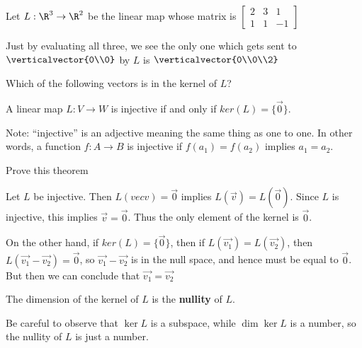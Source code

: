 \documentclass{ximera}
\begin{document}
\begin{question}
	Let $L:\R^3 \to \R^2$ be the linear map whose matrix is 
	\( \begin{bmatrix} 
		2 & 3 & 1\\
		1 & 1 & -1
	\end{bmatrix}\)
	\begin{solution}
		\begin{hint}
			Just by evaluating all three, we see the only one which gets sent to $\verticalvector{0\\0}$ by $L$ is $\verticalvector{0\\0\\2}$
		\end{hint}
		Which of the following vectors is in the kernel of $L$?
		\begin{multiple-choice}
		\end{multiple-choice}
	\end{solution}
\end{question}

\begin{theorem}
	A linear map $L:V \to W$ is injective if and only if $ker(L) = \{\vec{0}\}$.
\end{theorem}

Note:  ``injective'' is an adjective meaning the same thing as one to one.  In other words, a function $f:A \to B$ is injective if $f(a_1)=f(a_2)$ implies $a_1=a_2$.

Prove this theorem
	
\begin{free-response}
	Let $L$ be injective.  Then $L(vec{v}) = \vec{0}$ implies $L(\vec{v}) = L(\vec{0})$.  Since $L$ is injective, this implies $\vec{v} = \vec{0}$.  Thus the only element
	of the kernel is $\vec{0}$.
	
	On the other hand, if $ker(L) = \{\vec{0}\}$, then if $L(\vec{v_1}) = L(\vec{v_2})$, then $L(\vec{v_1}-\vec{v_2})= \vec{0}$, so $\vec{v_1}-\vec{v_2}$
	 is in the null space, and hence must be equal to $\vec{0}$.  But then we can conclude that $\vec{v_1} = \vec{v_2}$
	\end{free-response}

\begin{definition}
  The dimension of the kernel of $L$ is the \textbf{nullity} of $L$.        
\end{definition}

Be careful to observe that $\ker L$ is a subspace, while $\dim \ker L$
is a number, so the nullity of $L$ is just a number.
\end{document}
